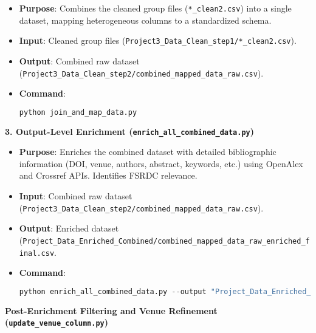 \documentclass[12pt]{article}
\begin{document}
\begin{itemize}
\item
  \textbf{Purpose}: Combines the cleaned group files
  (\texttt{*\_clean2.csv}) into a single dataset, mapping heterogeneous
  columns to a standardized schema.
\item
  \textbf{Input}: Cleaned group files
  (\texttt{Project3\_Data\_Clean\_step1/*\_clean2.csv}).
\item
  \textbf{Output}: Combined raw dataset
  (\texttt{Project3\_Data\_Clean\_step2/combined\_mapped\_data\_raw.csv}).
\item
  \textbf{Command}:

\begin{lstlisting}[language=Python]
python join_and_map_data.py
\end{lstlisting}
\end{itemize}

\textbf{3. Output-Level Enrichment
(\texttt{enrich\_all\_combined\_data.py})}

\begin{itemize}
\item
  \textbf{Purpose}: Enriches the combined dataset with detailed
  bibliographic information (DOI, venue, authors, abstract, keywords,
  etc.) using OpenAlex and Crossref APIs. Identifies FSRDC relevance.
\item
  \textbf{Input}: Combined raw dataset
  (\texttt{Project3\_Data\_Clean\_step2/combined\_mapped\_data\_raw.csv}).
\item
  \textbf{Output}: Enriched dataset
  (\texttt{Project\_Data\_Enriched\_Combined/combined\_mapped\_data\_raw\_enriched\_final.csv}.
\item
  \textbf{Command}:

\begin{lstlisting}[language=Python]
python enrich_all_combined_data.py --output "Project_Data_Enriched_Combined/combined_mapped_data_raw_enriched_final.csv"
\end{lstlisting}
\end{itemize}

\textbf{Post-Enrichment Filtering and Venue Refinement
(\texttt{update\_venue\_column.py})}
\end{document}
